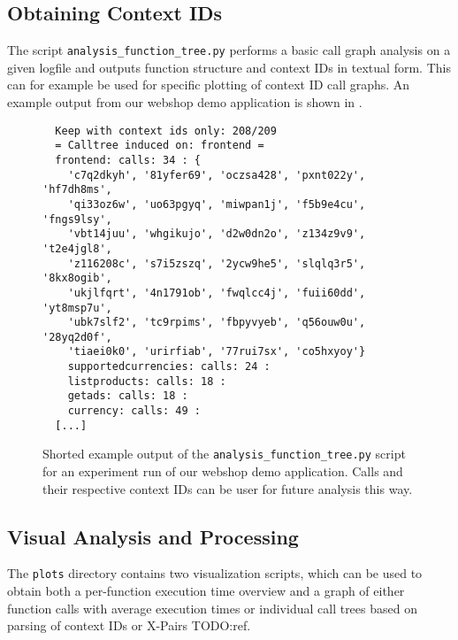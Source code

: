 \documentclass[../main.tex]{subfiles}
\begin{document}
\subsection{Obtaining Context IDs}%
\label{sub:analysisUsageContextIDs}

The script \texttt{analysis\_function\_tree.py} performs a basic call graph analysis on a given logfile
and outputs function structure and context IDs in textual form. 
This can for example be used for specific plotting of context ID call graphs.
An example output from our webshop demo application is shown in .

\begin{figure}
\begin{tcolorbox}
  \begin{verbatim}
  Keep with context ids only: 208/209
  = Calltree induced on: frontend =
  frontend: calls: 34 : {
    'c7q2dkyh', '81yfer69', 'oczsa428', 'pxnt022y', 'hf7dh8ms', 
    'qi33oz6w', 'uo63pgyq', 'miwpan1j', 'f5b9e4cu', 'fngs9lsy', 
    'vbt14juu', 'whgikujo', 'd2w0dn2o', 'z134z9v9', 't2e4jgl8', 
    'z116208c', 's7i5zszq', '2ycw9he5', 'slqlq3r5', '8kx8ogib', 
    'ukjlfqrt', '4n1791ob', 'fwqlcc4j', 'fuii60dd', 'yt8msp7u', 
    'ubk7slf2', 'tc9rpims', 'fbpyvyeb', 'q56ouw0u', '28yq2d0f', 
    'tiaei0k0', 'urirfiab', '77rui7sx', 'co5hxyoy'}
    supportedcurrencies: calls: 24 :
    listproducts: calls: 18 :
    getads: calls: 18 :
    currency: calls: 49 :
  [...]
  \end{verbatim}
\end{tcolorbox}
\caption[Function Tree Script Example]{%
  Shorted example output of the \texttt{analysis\_function\_tree.py} script for 
  an experiment run of our webshop demo application.
  Calls and their respective context IDs can be user for future analysis this way.%
}
\label{fig:contextIDExtractExample}
\end{figure}

\subsection{Visual Analysis and Processing}%
\label{sub:analysisUsageVisualProcessing}

The \texttt{plots} directory contains two visualization scripts, 
which can be used to obtain both a per-function execution time overview and 
a graph of either function calls with average execution times or individual call trees based on parsing of context IDs or X-Pairs TODO:\@ ref.
\end{document}
